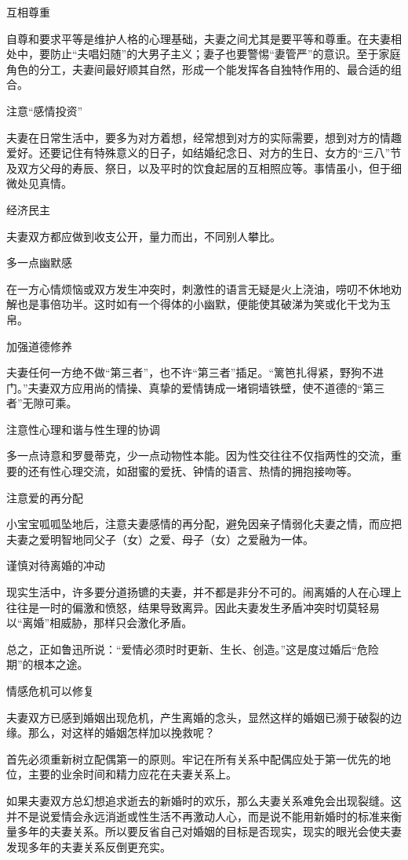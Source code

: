 \documentclass[12pt,UTF8]{ctexbook}
\begin{document}
互相尊重

自尊和要求平等是维护人格的心理基础，夫妻之间尤其是要平等和尊重。在夫妻相处中，要防止“夫唱妇随”的大男子主义；妻子也要警惕“妻管严”的意识。至于家庭角色的分工，夫妻间最好顺其自然，形成一个能发挥各自独特作用的、最合适的组合。

注意“感情投资”

夫妻在日常生活中，要多为对方着想，经常想到对方的实际需要，想到对方的情趣爱好。还要记住有特殊意义的日子，如结婚纪念日、对方的生日、女方的“三八”节及双方父母的寿辰、祭日，以及平时的饮食起居的互相照应等。事情虽小，但于细微处见真情。

经济民主

夫妻双方都应做到收支公开，量力而出，不同别人攀比。

多一点幽默感

在一方心情烦恼或双方发生冲突时，刺激性的语言无疑是火上浇油，唠叨不休地劝解也是事倍功半。这时如有一个得体的小幽默，便能使其破涕为笑或化干戈为玉帛。

加强道德修养

夫妻任何一方绝不做“第三者”，也不许“第三者”插足。“篱笆扎得紧，野狗不进门。”夫妻双方应用尚的情操、真挚的爱情铸成一堵铜墙铁壁，使不道德的“第三者”无隙可乘。

注意性心理和谐与性生理的协调

多一点诗意和罗曼蒂克，少一点动物性本能。因为性交往往不仅指两性的交流，重要的还有性心理交流，如甜蜜的爱抚、钟情的语言、热情的拥抱接吻等。

注意爱的再分配

小宝宝呱呱坠地后，注意夫妻感情的再分配，避免因亲子情弱化夫妻之情，而应把夫妻之爱明智地同父子（女）之爱、母子（女）之爱融为一体。

谨慎对待离婚的冲动

现实生活中，许多要分道扬镳的夫妻，并不都是非分不可的。闹离婚的人在心理上往往是一时的偏激和愤怒，结果导致离异。因此夫妻发生矛盾冲突时切莫轻易以“离婚”相威胁，那样只会激化矛盾。

总之，正如鲁迅所说：“爱情必须时时更新、生长、创造。”这是度过婚后“危险期”的根本之途。





情感危机可以修复


夫妻双方已感到婚姻出现危机，产生离婚的念头，显然这样的婚姻已濒于破裂的边缘。那么，对这样的婚姻怎样加以挽救呢？

首先必须重新树立配偶第一的原则。牢记在所有关系中配偶应处于第一优先的地位，主要的业余时间和精力应花在夫妻关系上。

如果夫妻双方总幻想追求逝去的新婚时的欢乐，那么夫妻关系难免会出现裂缝。这并不是说爱情会永远消逝或性生活不再激动人心，而是说不能用新婚时的标准来衡量多年的夫妻关系。所以要反省自己对婚姻的目标是否现实，现实的眼光会使夫妻发现多年的夫妻关系反倒更充实。
\end{document}
